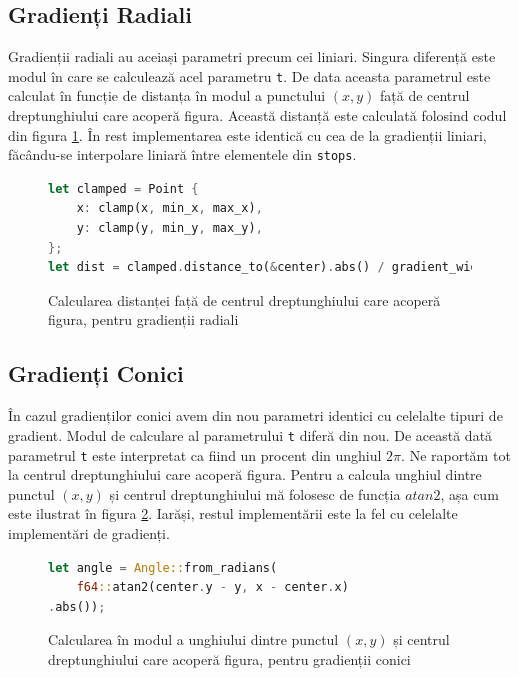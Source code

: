 \documentclass[a4paper, 12pt]{report}
\begin{document}
\subsection{Gradienți Radiali}

Gradienții radiali au aceiași parametri precum cei liniari. Singura diferență este modul în care se calculează acel parametru
\texttt{t}. De data aceasta parametrul este calculat în funcție de distanța în modul a punctului \((x, y)\) față de centrul
dreptunghiului care acoperă figura. Această distanță este calculată folosind codul din figura \ref{fig-radial-gradient-impl}.
În rest implementarea este identică cu cea de la gradienții liniari, făcându-se interpolare liniară între elementele din
\texttt{stops}.

\begin{figure}[ht]
    \centering
    \begin{lstlisting}[language=Rust]
let clamped = Point {
    x: clamp(x, min_x, max_x),
    y: clamp(y, min_y, max_y),
};
let dist = clamped.distance_to(&center).abs() / gradient_width;
    \end{lstlisting}
    \caption{Calcularea distanței față de centrul dreptunghiului care acoperă figura, pentru gradienții radiali}
    \label{fig-radial-gradient-impl}
\end{figure}

\subsection{Gradienți Conici}

În cazul gradienților conici avem din nou parametri identici cu celelalte tipuri de gradient. Modul de calculare al parametrului
\texttt{t} diferă din nou. De această dată parametrul \texttt{t} este interpretat ca fiind un procent din unghiul \(2\pi\).
Ne raportăm tot la centrul dreptunghiului care acoperă figura. Pentru a calcula unghiul dintre punctul \((x, y)\) și centrul
dreptunghiului mă folosesc de funcția \(atan2\), așa cum este ilustrat în figura \ref{fig-conic-gradient-impl}. Iarăși, restul
implementării este la fel cu celelalte implementări de gradienți.

\begin{figure}[ht]
    \centering
    \begin{lstlisting}[language=Rust]
let angle = Angle::from_radians(
    f64::atan2(center.y - y, x - center.x)
.abs());
    \end{lstlisting}
    \caption{Calcularea în modul a unghiului dintre punctul \((x, y)\) și centrul dreptunghiului care acoperă figura, pentru gradienții conici}
    \label{fig-conic-gradient-impl}
\end{figure}
\end{document}
